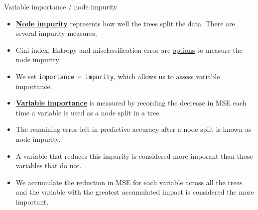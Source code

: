 \documentclass[
  10pt,
  ignorenonframetext,
]{beamer}
\begin{document}
\begin{frame}[fragile]{Variable importance / node impurity}
\protect\hypertarget{variable-importance-node-impurity}{}

\begin{itemize}
\item
  \href{https://stats.stackexchange.com/questions/223109/what-do-we-mean-by-node-impurity-ref-random-forest}{\textbf{Node
  impurity}} represents how well the trees split the data. There are
  several impurity measures;
\item
  Gini index, Entropy and misclassification error are
  \href{https://www.cs.indiana.edu/~predrag/classes/2017fallb365/ch4.pdf}{options}
  to measure the node impurity
\item
  We set
  \texttt{importance\ =\ \textquotesingle{}impurity\textquotesingle{}},
  which allows us to assess variable importance.
\item
  \href{https://topepo.github.io/caret/variable-importance.html}{\textbf{Variable
  importance}} is measured by recording the decrease in MSE each time a
  variable is used as a node split in a tree.
\item
  The remaining error left in predictive accuracy after a node split is
  known as node impurity. 
\item
  A variable that reduces this impurity is considered more imporant than
  those variables that do not.
\item
  We accumulate the reduction in MSE for each variable across all the
  trees and the variable with the greatest accumulated impact is
  considered the more important.
\end{itemize}

\end{frame}
\end{document}

